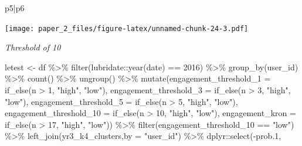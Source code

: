 \documentclass[
]{article}
\newenvironment{Shaded}{\begin{snugshade}}{\end{snugshade}}
\newcommand{\AttributeTok}[1]{\textcolor[rgb]{0.77,0.63,0.00}{#1}}
\newcommand{\DecValTok}[1]{\textcolor[rgb]{0.00,0.00,0.81}{#1}}
\newcommand{\FloatTok}[1]{\textcolor[rgb]{0.00,0.00,0.81}{#1}}
\newcommand{\FunctionTok}[1]{\textcolor[rgb]{0.00,0.00,0.00}{#1}}
\newcommand{\NormalTok}[1]{#1}
\newcommand{\OtherTok}[1]{\textcolor[rgb]{0.56,0.35,0.01}{#1}}
\newcommand{\SpecialCharTok}[1]{\textcolor[rgb]{0.00,0.00,0.00}{#1}}
\newcommand{\StringTok}[1]{\textcolor[rgb]{0.31,0.60,0.02}{#1}}
\begin{document}
\begin{Shaded}
\begin{Highlighting}[]
\NormalTok{p5}\SpecialCharTok{|}\NormalTok{p6}
\end{Highlighting}
\end{Shaded}

\texttt{[image: paper\_2\_files/figure-latex/unnamed-chunk-24-3.pdf]}

\emph{Threshold of 10}

\begin{Shaded}
\begin{Highlighting}[]
\NormalTok{letest }\OtherTok{\textless{}{-}}\NormalTok{  df }\SpecialCharTok{\%\textgreater{}\%}
  \FunctionTok{filter}\NormalTok{(lubridate}\SpecialCharTok{::}\FunctionTok{year}\NormalTok{(date) }\SpecialCharTok{==} \DecValTok{2016}\NormalTok{) }\SpecialCharTok{\%\textgreater{}\%}
  \FunctionTok{group\_by}\NormalTok{(user\_id) }\SpecialCharTok{\%\textgreater{}\%}
  \FunctionTok{count}\NormalTok{() }\SpecialCharTok{\%\textgreater{}\%}
  \FunctionTok{ungroup}\NormalTok{() }\SpecialCharTok{\%\textgreater{}\%} 
  \FunctionTok{mutate}\NormalTok{(}\AttributeTok{engagement\_threshold\_1 =} \FunctionTok{if\_else}\NormalTok{(n }\SpecialCharTok{\textgreater{}} \DecValTok{1}\NormalTok{, }\StringTok{"high"}\NormalTok{, }\StringTok{"low"}\NormalTok{),}
         \AttributeTok{engagement\_threshold\_3 =} \FunctionTok{if\_else}\NormalTok{(n }\SpecialCharTok{\textgreater{}} \DecValTok{3}\NormalTok{, }\StringTok{"high"}\NormalTok{, }\StringTok{"low"}\NormalTok{),}
         \AttributeTok{engagement\_threshold\_5 =} \FunctionTok{if\_else}\NormalTok{(n }\SpecialCharTok{\textgreater{}} \DecValTok{5}\NormalTok{, }\StringTok{"high"}\NormalTok{, }\StringTok{"low"}\NormalTok{),}
         \AttributeTok{engagement\_threshold\_10 =} \FunctionTok{if\_else}\NormalTok{(n }\SpecialCharTok{\textgreater{}} \DecValTok{10}\NormalTok{, }\StringTok{"high"}\NormalTok{, }\StringTok{"low"}\NormalTok{),}
         \AttributeTok{engagement\_kron =} \FunctionTok{if\_else}\NormalTok{(n }\SpecialCharTok{\textgreater{}} \DecValTok{17}\NormalTok{, }\StringTok{"high"}\NormalTok{, }\StringTok{"low"}\NormalTok{)) }\SpecialCharTok{\%\textgreater{}\%} 
  \FunctionTok{filter}\NormalTok{(engagement\_threshold\_10 }\SpecialCharTok{==} \StringTok{"low"}\NormalTok{) }\SpecialCharTok{\%\textgreater{}\%} 
  \FunctionTok{left\_join}\NormalTok{(yr3\_k4\_clusters,}\AttributeTok{by =} \StringTok{"user\_id"}\NormalTok{) }\SpecialCharTok{\%\textgreater{}\%} 
\NormalTok{  dplyr}\SpecialCharTok{::}\FunctionTok{select}\NormalTok{(}\SpecialCharTok{{-}}\NormalTok{prob}\FloatTok{.1}\NormalTok{,}

\end{Highlighting}
\end{Shaded}
\end{document}
